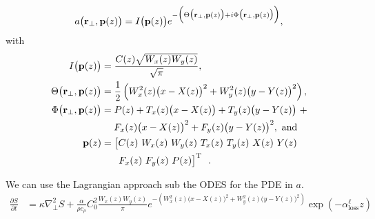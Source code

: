\documentclass[a4paper, 12pt]{amsbook}
\begin{document}
\begin{equation*}
    \begin{aligned}
 a\big( {\bf r}_{\perp}, {\bf p}(z) \big) = I\big( {\bf p}(z) \big) e^{-\Big( \Theta\big( {\bf r}_{\perp},{\bf p}(z) \big) + i \Phi\big( {\bf r}_{\perp}, {\bf p}(z) \big) \Big)},
   \end{aligned}
\end{equation*}
with 
\begin{align*}
 I\big( {\bf p}(z) \big) & = \frac{C(z) \sqrt{W_{x}(z) W_{y}(z)}}{\sqrt{\pi}}, \\
 \Theta\big( {\bf r}_{\perp}, {\bf p}(z) \big) & = \frac{1}{2} \left( W_{x}^{2}(z) \big( x - X(z) \big)^{2} + W_{y}^{2}(z) \big( y - Y(z) \big)^{2} \right), \\
 \Phi\big( {\bf r}_{\perp}, {\bf p}(z) \big) & = P(z) + T_{x}(z) \big( x - X(z) \big) + T_{y}(z) \big( y - Y(z) \big) \ + \\
 & \hspace{13pt} F_{x}(z) \big( x - X(z) \big)^{2} + F_{y}(z) \big( y - Y(z) \big)^{2}, \text{ and} \\
 {\bf p}(z) & = \big[ C(z) \ W_{x}(z) \ W_{y}(z) \ T_{x}(z) \ T_{y}(z) \ X(z) \ Y(z) \\
 & \hspace{18pt} F_{x}(z) \ F_{y}(z) \ P(z) \big]^{\text{T}} \ \ .
\end{align*}


We can use the Lagrangian approach sub the ODES for the PDE in $a$.
\begin{equation*}
    \begin{aligned}
        \frac{\partial S}{\partial t} &= \kappa \nabla_{\perp}^2 S + \frac{\alpha }{\rho c_\rho} C_0^2 \frac{ W_{x}(z) W_{y}(z)}{\pi} e^{-\left( W_{x}^{2}(z) \big( x - X(z) \big)^{2} + W_{y}^{2}(z) \big( y - Y(z) \big)^{2} \right)} \exp{(- \alpha^\ell_\text{loss} z)}
    \end{aligned}
\end{equation*}
\end{document}
